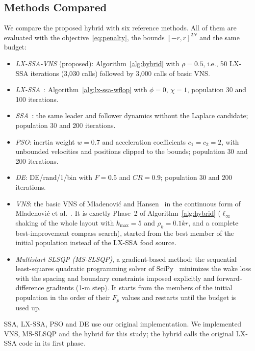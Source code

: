 \documentclass[journal,twoside]{IEEEtran}
\begin{document}
\subsection{Methods Compared}
We compare the proposed hybrid with six reference methods. All of them are evaluated with the objective~\eqref{eq:penalty}, the bounds $[-r,r]^{2N}$ and the same budget:
\begin{itemize}
\item \emph{LX-SSA-VNS} (proposed): Algorithm~\ref{alg:hybrid} with $\rho=0.5$, i.e., 50 LX-SSA iterations (3,030 calls) followed by 3,000 calls of basic VNS.
\item \emph{LX-SSA}~\cite{Solanki2023}: Algorithm~\ref{alg:lx-ssa-wflop} with $\phi=0$, $\chi=1$, population 30 and 100 iterations.
\item \emph{SSA}~\cite{Mirjalili2017}: the same leader and follower dynamics without the Laplace candidate; population 30 and 200 iterations.
\item \emph{PSO}: inertia weight $w=0.7$ and acceleration coefficients $c_1=c_2=2$, with unbounded velocities and positions clipped to the bounds; population 30 and 200 iterations.
\item \emph{DE}: DE/rand/1/bin with $F=0.5$ and $CR=0.9$; population 30 and 200 iterations.
\item \emph{VNS}: the basic VNS of Mladenovi\'c and Hansen~\cite{Mladenovic1997,Hansen2001} in the continuous form of Mladenovi\'c et al.~\cite{Mladenovic2008}. It is exactly Phase~2 of Algorithm~\ref{alg:hybrid} ($\ell_\infty$ shaking of the whole layout with $k_{\max}=5$ and $\rho_k=0.1kr$, and a complete best-improvement compass search), started from the best member of the initial population instead of the LX-SSA food source.
\item \emph{Multistart SLSQP (MS-SLSQP)}, a gradient-based method: the sequential least-squares quadratic programming solver of SciPy~\cite{Kraft1988} minimizes the wake loss with the spacing and boundary constraints imposed explicitly and forward-difference gradients (1-m step). It starts from the members of the initial population in the order of their $F_p$ values and restarts until the budget is used up.
\end{itemize}
SSA, LX-SSA, PSO and DE use our original implementation. We implemented VNS, MS-SLSQP and the hybrid for this study; the hybrid calls the original LX-SSA code in its first phase.
\end{document}
